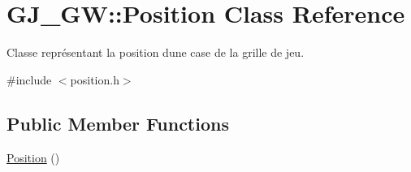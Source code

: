\hypertarget{class_g_j___g_w_1_1_position}{}\section{G\+J\+\_\+\+GW\+:\+:Position Class Reference}
\label{class_g_j___g_w_1_1_position}


Classe représentant la position d\textquotesingle{}une case de la grille de jeu.  




{\ttfamily \#include $<$position.\+h$>$}

\subsection*{Public Member Functions}
\begin{DoxyCompactItemize}
\item 
\hyperlink{class_g_j___g_w_1_1_position_a90913522e4c57a095bd9c3669f708c7b}{Position} ()\hypertarget{class_g_j___g_w_1_1_position_a90913522e4c57a095bd9c3669f708c7b}{}\label{class_g_j___g_w_1_1_position_a90913522e4c57a095bd9c3669f708c7b}


\end{DoxyCompactItemize}
